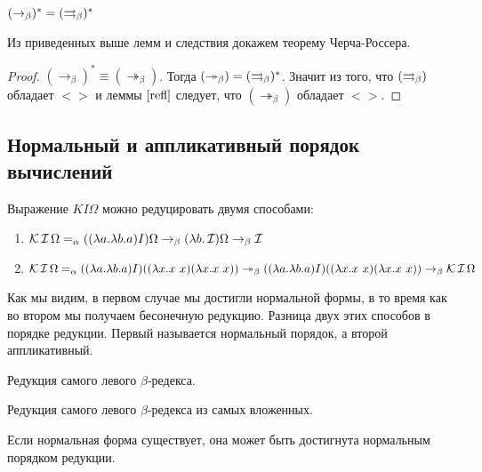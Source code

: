 \begin{cons}
	$(\to_{\beta})^{*}=(\rightrightarrows_{\beta} )^{*}$
\end{cons}

Из приведенных выше лемм и следствия докажем теорему Черча-Россера.

\begin{proof}
	$(\to_{\beta})^{*}\equiv(\twoheadrightarrow_{\beta})$. Тогда $(\twoheadrightarrow_{\beta})=(\rightrightarrows_{\beta} )^{*}$. Значит из того, что $(\rightrightarrows_{\beta} )$ обладает $<>$ и леммы $\ref{refl}$ следует, что $(\twoheadrightarrow_{\beta})$ обладает $<>$.
\end{proof}

\subsection{Нормальный и аппликативный порядок вычислений}

\begin{example}
	Выражение $KI\Omega$ можно редуцировать двумя способами:
	\begin{enumerate}
		\item $\operatorname{\mathcal{K}} \operatorname{\mathcal{I}} \Omega =_{\alpha} ((\lambda{}a.\lambda{}b.a) I) \Omega \to_{\beta} (\lambda{}b.\operatorname{\mathcal{I}})\Omega  \to_{\beta} \operatorname{\mathcal{I}}$
		\item  $\comb K \comb I \Omega =_{\alpha} ((\lambda{}a.\lambda{}b.a) I)((\lambda{}x.x \ x) (\lambda{}x.x \ x)) \twoheadrightarrow_{\beta} ((\lambda{}a.\lambda{}b.a) I)((\lambda{}x.x \ x) (\lambda{}x.x \ x)) \to_{\beta} \comb K \comb I \Omega $
	\end{enumerate}
	
\end{example}

Как мы видим, в первом случае мы достигли нормальной формы, в то время как во втором мы получаем бесонечную редукцию. Разница двух этих способов в порядке редукции. Первый называется нормальный порядок, а второй аппликативный. 

\begin{definition}
	Редукция самого левого $\beta$-редекса.
\end{definition}

\begin{definition}
	Редукция самого левого $\beta$-редекса из самых вложенных.
\end{definition}

\begin{statement}
	Если нормальная форма существует, она может быть достигнута нормальным порядком редукции.
\end{statement}